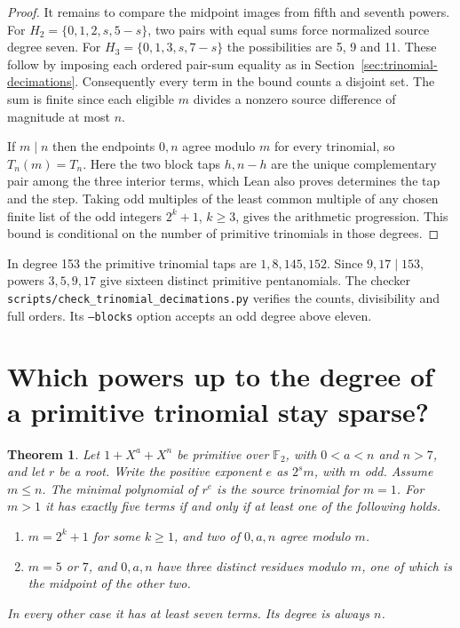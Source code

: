 \documentclass[11pt]{article}
\newtheorem{theorem}{Theorem}
\newcommand{\F}{\mathbb F_2}
\begin{document}
\begin{proof}
It remains to compare the midpoint images from fifth and seventh
powers. For \(H_2=\{0,1,2,s,5-s\}\), two pairs with equal sums
force normalized source degree seven. For \(H_3=\{0,1,3,s,7-s\}\)
the possibilities are 5, 9 and 11. These follow by imposing each
ordered pair-sum equality as in Section~\ref{sec:trinomial-decimations}.
Consequently every term in the bound counts a disjoint set. The
sum is finite since each eligible \(m\) divides a nonzero source
difference of magnitude at most \(n\).

If \(m\mid n\) then the endpoints \(0,n\) agree modulo \(m\) for
every trinomial, so \(T_n(m)=T_n\). Here the two block taps \(h,n-h\)
are the unique complementary pair among the three interior terms,
which Lean also proves determines the tap and the step. Taking odd multiples of the
least common multiple of any chosen finite list of the odd integers
\(2^k+1\), \(k\ge3\), gives the arithmetic progression. This bound
is conditional on the number of primitive trinomials in those degrees.
\end{proof}
In degree 153 the primitive trinomial taps are \(1,8,145,152\).
Since \(9,17\mid153\), powers \(3,5,9,17\) give sixteen distinct
primitive pentanomials. The checker
\nolinkurl{scripts/check_trinomial_decimations.py} verifies the
counts, divisibility and full orders. Its \texttt{--blocks} option
accepts an odd degree above eleven.

\section{Which powers up to the degree of a primitive trinomial stay sparse?}
\label{sec:short-trinomial-powers}

\begin{theorem}
Let \(1+X^a+X^n\) be primitive over \(\F\), with \(0<a<n\) and
\(n>7\), and let \(r\) be a root. Write the positive exponent \(e\)
as \(2^s m\), with \(m\) odd. Assume \(m\le n\). The minimal polynomial
of \(r^e\) is the source trinomial for \(m=1\). For \(m>1\) it has
exactly five terms if and only if at least one of the following holds.
\begin{enumerate}
\item \(m=2^k+1\) for some \(k\ge1\), and two of \(0,a,n\) agree modulo \(m\).
\item \(m=5\) or \(7\), and \(0,a,n\) have three distinct residues modulo
\(m\), one of which is the midpoint of the other two.
\end{enumerate}
In every other case it has at least seven terms. Its degree is always \(n\).
\end{theorem}
\end{document}
